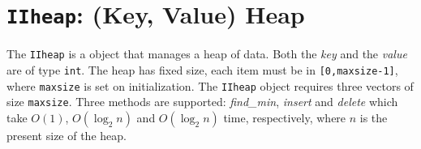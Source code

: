 \chapter{{\tt IIheap}: 
(Key, Value) Heap}
\par
The {\tt IIheap} is a object that manages a heap of data.
Both the {\it key} and the {\it value} are of type {\tt int}.
The heap has fixed size, each item must be in {\tt [0,maxsize-1]},
where {\tt maxsize} is set on initialization.
The {\tt IIheap} object requires three vectors of size {\tt maxsize}.
Three methods are supported: {\it find\_min}, {\it insert} and {\it
delete} which take $O(1)$, $O(\log_2 n)$ and $O(\log_2 n)$ time, 
respectively, where $n$ is the present size of the heap.
